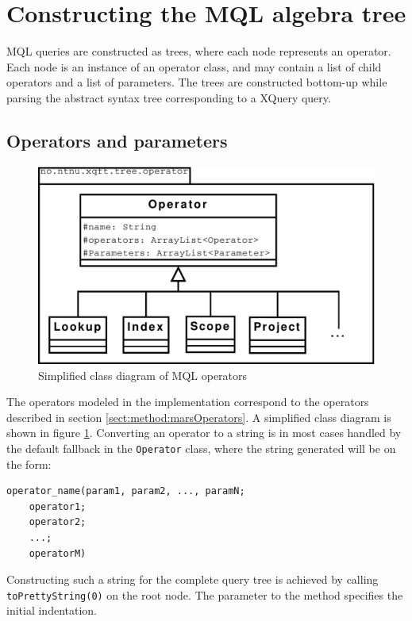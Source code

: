 \section{Constructing the MQL algebra tree}
\label{sect:impl:construct_mql}
MQL queries are constructed as trees, where each node represents an operator. Each node is an instance of an
operator class, and may contain a list of child operators and a list of parameters. The trees are constructed
bottom-up while parsing the abstract syntax tree corresponding to a XQuery query.

\subsection{Operators and parameters}
\begin{figure}[!htp]
\begin{center}
  \includegraphics[scale=0.5]{diagrams/mql_operator_uml}
  \caption{Simplified class diagram of MQL operators}
  \label{fig:impl:mql_op_uml}
\end{center}
\end{figure}
The operators modeled in the implementation correspond to the operators
described in section \ref{sect:method:marsOperators}. A simplified class
diagram is shown in figure \ref{fig:impl:mql_op_uml}. Converting an operator to a string is in most cases
handled by the default fallback in the \texttt{Operator} class, where the string generated will be on the form:
\begin{Verbatim}
operator_name(param1, param2, ..., paramN; 
    operator1;
    operator2; 
    ...; 
    operatorM)
\end{Verbatim}

Constructing such a string for the complete query tree is achieved by calling \texttt{toPrettyString(0)} on the
root node. The parameter to the method specifies the initial indentation.

